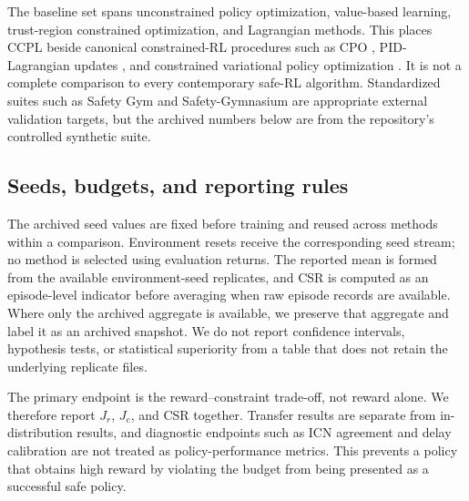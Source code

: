 \documentclass[10pt]{article}
\begin{document}
The baseline set spans unconstrained policy optimization, value-based learning,
trust-region constrained optimization, and Lagrangian methods. This places
CCPL beside canonical constrained-RL procedures such as CPO
\citep{achiam2017}, PID-Lagrangian updates \citep{stooke2020}, and constrained
variational policy optimization \citep{liu2022cvpo}. It is not a complete
comparison to every contemporary safe-RL algorithm. Standardized suites such
as Safety Gym \citep{ray2019safetygym} and Safety-Gymnasium
\citep{ji2023safetygym} are appropriate external validation targets, but the
archived numbers below are from the repository's controlled synthetic suite.

\subsection{Seeds, budgets, and reporting rules}
The archived seed values are fixed before training and reused across methods
within a comparison. Environment resets receive the corresponding seed stream;
no method is selected using evaluation returns. The reported mean is formed
from the available environment-seed replicates, and CSR is computed as an
episode-level indicator before averaging when raw episode records are
available. Where only the archived aggregate is available, we preserve that
aggregate and label it as an archived snapshot. We do not report confidence
intervals, hypothesis tests, or statistical superiority from a table that does
not retain the underlying replicate files.

The primary endpoint is the reward--constraint trade-off, not reward alone.
We therefore report $J_r$, $J_c$, and CSR together. Transfer results are
separate from in-distribution results, and diagnostic endpoints such as ICN
agreement and delay calibration are not treated as policy-performance metrics.
This prevents a policy that obtains high reward by violating the budget from
being presented as a successful safe policy.
\end{document}
